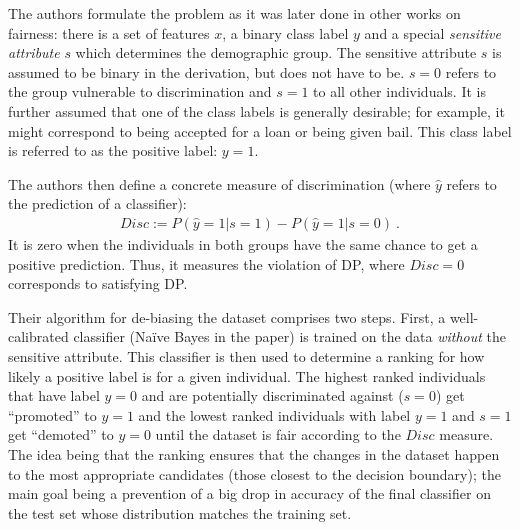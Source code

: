 The authors formulate the problem as it was later done in other works on fairness: there is a set
of features \(x\), a binary class label \(y\) and a special \emph{sensitive attribute} \(s\) which
determines the demographic group. The sensitive attribute \(s\) is assumed to be binary in the
derivation, but does not have to be. \(s=0\) refers to the group vulnerable to discrimination and
\(s=1\) to all other individuals. It is further assumed that one of the class labels is generally
desirable; for example, it might correspond to being accepted for a loan or being given bail. This
class label is referred to as the positive label: \(y = 1\).

The authors then define a concrete measure of discrimination (where $\hat{y}$ refers to the
prediction of a classifier): \begin{align} \label{eq:disc} Disc := P(\hat{y}=1|s =1) -
P(\hat{y}=1|s = 0)~. \end{align}
It is zero when the individuals in both groups have the same chance to get a positive prediction.
Thus, it measures the violation of \ac{DP}, where $Disc=0$ corresponds to satisfying \ac{DP}.

Their algorithm for de-biasing the dataset comprises two steps. First, a well-calibrated classifier
(Na\"ive Bayes in the paper) is trained on the data \emph{without} the sensitive attribute. This
classifier is then used to determine a ranking for how likely a positive label is for a given
individual. The highest ranked individuals that have label \(y=0\) and are potentially
discriminated against (\(s=0\)) get ``promoted'' to \(y=1\) and the lowest ranked individuals with
label \(y=1\) and \(s=1\) get ``demoted'' to \(y=0\) until the dataset is fair according to the
\(Disc\) measure. The idea being that the ranking ensures that the changes in the dataset happen to
the most appropriate candidates (those closest to the decision boundary); the main goal being a
prevention of a big drop in accuracy of the final classifier on the test set whose distribution
matches the training set.


